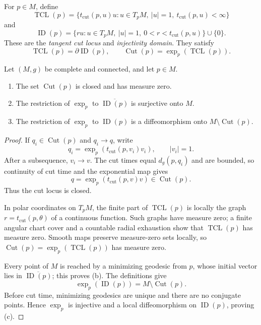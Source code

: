 For $p\in M$, define
\[
\operatorname{TCL}(p)
=\{t_{\mathrm{cut}}(p,u)u:
u\in T_pM,\ |u|=1,\ t_{\mathrm{cut}}(p,u)<\infty\}
\]
and
\[
\operatorname{ID}(p)
=\{ru:u\in T_pM,\ |u|=1,\ 0<r<t_{\mathrm{cut}}(p,u)\}\cup\{0\}.
\]
These are the \emph{tangent cut locus} and \emph{injectivity domain}. They
satisfy
\[
\operatorname{TCL}(p)=\partial\operatorname{ID}(p),
\qquad
\operatorname{Cut}(p)=\exp_p(\operatorname{TCL}(p)).
\]

\begin{theorem}
\label{thm:cut-locus-properties}
Let $(M,g)$ be complete and connected, and let $p\in M$.
\begin{enumerate}
\item[(a)] The set $\operatorname{Cut}(p)$ is closed and has measure zero.
\item[(b)] The restriction of $\exp_p$ to
$\overline{\operatorname{ID}(p)}$ is surjective onto $M$.
\item[(c)] The restriction of $\exp_p$ to $\operatorname{ID}(p)$ is a
diffeomorphism onto $M\setminus\operatorname{Cut}(p)$.
\end{enumerate}

\begin{proof}
\sketch If $q_i\in\operatorname{Cut}(p)$ and $q_i\to q$, write
\[
q_i=\exp_p(t_{\mathrm{cut}}(p,v_i)v_i),
\qquad |v_i|=1.
\]
After a subsequence, $v_i\to v$. The cut times equal $d_g(p,q_i)$ and are
bounded, so continuity of cut time and the exponential map gives
\[
q=\exp_p(t_{\mathrm{cut}}(p,v)v)\in\operatorname{Cut}(p).
\]
Thus the cut locus is closed.

In polar coordinates on $T_pM$, the finite part of
$\operatorname{TCL}(p)$ is locally the graph
$r=t_{\mathrm{cut}}(p,\theta)$ of a continuous function. Such graphs have
measure zero; a finite angular chart cover and a countable radial exhaustion
show that $\operatorname{TCL}(p)$ has measure zero. Smooth maps preserve
measure-zero sets locally, so
$\operatorname{Cut}(p)=\exp_p(\operatorname{TCL}(p))$ has measure zero.

Every point of $M$ is reached by a minimizing geodesic from $p$, whose initial
vector lies in $\overline{\operatorname{ID}(p)}$; this proves (b). The
definitions give
\[
\exp_p(\operatorname{ID}(p))=M\setminus\operatorname{Cut}(p).
\]
Before cut time, minimizing geodesics are unique and there are no conjugate
points. Hence $\exp_p$ is injective and a local diffeomorphism on
$\operatorname{ID}(p)$, proving (c).
\end{proof}
\end{theorem}

